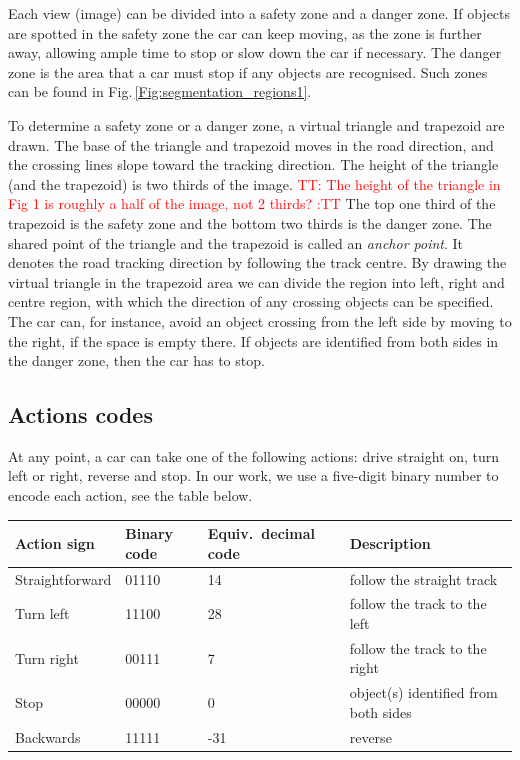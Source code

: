 \documentclass{svproc}
\renewcommand{\tt}[1]{\textcolor{red} {TT: #1 :TT} }
\begin{document}
Each view (image) can be divided into a safety zone and a danger zone. If objects are spotted in the safety zone the car can keep moving, as the zone is further away, allowing ample time to stop or slow down the car if necessary. The danger zone is the area that a car must stop if any objects are recognised. Such zones can be found in Fig.\,\ref{Fig:segmentation_regions1}. 

To determine a safety zone or a danger zone, a virtual triangle and trapezoid are drawn. The base of the triangle and trapezoid moves in the road direction, and the crossing lines slope toward the tracking direction. The height of the triangle (and the trapezoid) is two thirds of the image. \tt{The height of the triangle in Fig 1 is roughly a half of the image, not 2 thirds?} The top one third of the trapezoid is the safety zone and the bottom two thirds is the danger zone. The shared point of the triangle and the trapezoid is called an \emph{anchor point}. It denotes the road tracking direction by following the track centre. By drawing the virtual triangle in the trapezoid area we can divide the region into left, right and centre region, with which the direction of any crossing objects can be specified. The car can, for instance, avoid an object crossing from the left side by moving to the right, if the space is empty there. If objects are identified from both sides in the danger zone, then the car has to stop.  


\subsection{Actions codes} 
At any point, a car can take one of the following actions: drive straight on, turn left or right, reverse and stop. In our work, we use a five-digit binary number to encode each action, see the table below. %


\vspace{-0.5cm}
\begin{center}	\begin{tabular}{|C{2.5cm}|C{1.3cm}|C{2.5cm}|C{5.5cm}|}
\hline
		\textbf{Action sign} & \textbf{Binary code} & \textbf{Equiv.\ decimal code} & \textbf{Description} \\ \hline
	Straightforward	& 01110	& 14 & follow the straight track\\ \hline
	Turn left	& 11100 & 28 & follow the track to the left \\ \hline
	Turn right	& 00111 & 7 & follow the track to the right \\ \hline
	Stop& 00000 & 0 & object(s) identified from both sides\\ \hline
	Backwards& 11111 & -31 & reverse \\ \hline

	\end{tabular}
\end{center}
\end{document}
